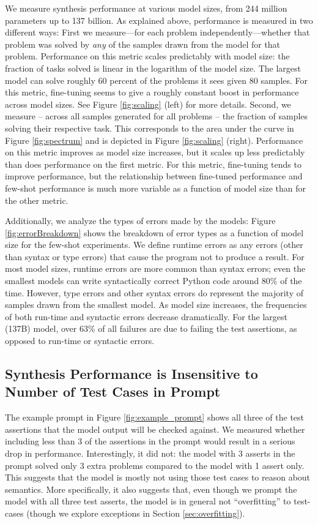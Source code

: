 We measure synthesis performance at various model sizes, from 244 million parameters up to 137 billion. As explained above, performance is measured in two different ways: First we measure---for each problem independently---whether that problem was solved by \textit{any} of the samples drawn from the model for that problem. Performance on this metric scales predictably with model size: the fraction of tasks solved is linear in the logarithm of the model size. The largest model can solve roughly 60 percent of the problems it sees given 80 samples. For this metric, fine-tuning seems to give a roughly constant boost in performance across model sizes. See Figure \ref{fig:scaling} (left) for more details. Second, we measure -- across all samples generated for all problems -- the fraction of samples solving their respective task. This corresponds to the area under the curve in Figure \ref{fig:spectrum} and is depicted in Figure \ref{fig:scaling} (right). Performance on this metric improves as model size increases, but it scales up less predictably than does performance on the first metric. For this metric, fine-tuning tends to improve performance, but the relationship between fine-tuned performance and few-shot performance is much more variable as a function of model size than for the other metric.

Additionally, we analyze the types of errors made by the models: Figure \ref{fig:errorBreakdown} shows the breakdown of error types as a function of model size for the few-shot experiments. We define runtime errors as any errors (other than syntax or type errors) that cause the program not to produce a result. For most model sizes, runtime errors are more common than syntax errors; even the smallest models can write syntactically correct Python code around 80\% of the time. However, type errors and other syntax errors do represent the majority of samples drawn from the smallest model. As model size increases, the frequencies of both run-time and syntactic errors decrease dramatically. For the largest (137B) model, over 63\% of all failures are due to failing the test assertions, as opposed to run-time or syntactic errors.

\subsection{Synthesis Performance is Insensitive to Number of Test Cases in Prompt}
\label{sec:testcasecount}

The example prompt in Figure \ref{fig:example_prompt} shows all three of the test assertions that the model output will be checked against. We measured whether including less than 3 of the assertions in the prompt would result in a serious drop in performance. Interestingly, it did not: the model with 3 asserts in the prompt solved only 3 extra problems compared to the model with 1 assert only. This suggests that the model is mostly not using those test cases to reason about semantics. More specifically, it also suggests that, even though we prompt the model with all three test asserts, the model is in general not ``overfitting'' to test-cases (though we explore exceptions in Section \ref{sec:overfitting}).

